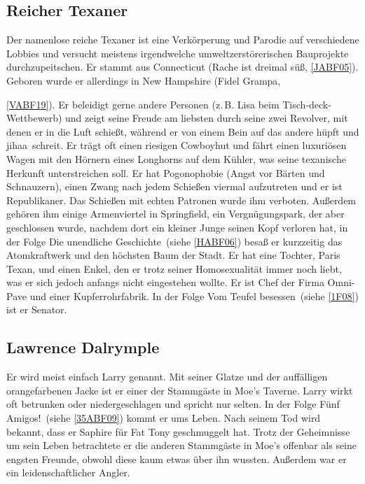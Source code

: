 {\subsection{Reicher Texaner}\label{ReicherTexaner}
Der namenlose reiche Texaner ist eine Verkörperung und Parodie auf verschiedene Lobbies und versucht meistens irgendwelche umweltzerstörerischen Bauprojekte durchzupeitschen. Er stammt aus Connecticut (\glqq Rache ist dreimal süß\grqq , \ref{JABF05}). Geboren wurde er allerdings in New Hampshire (\glqq Fidel Grampa\grqq, }\ref{VABF19}). Er beleidigt gerne andere Personen (z.\,B. Lisa beim Tisch-deck-Wettbewerb) und zeigt seine Freude am liebsten durch seine zwei Revolver, mit denen er in die Luft schießt, während er von einem Bein auf das andere hüpft und \glqq jihaa\grqq\ schreit. Er trägt oft einen riesigen Cowboyhut und fährt einen luxuriösen Wagen mit den Hörnern eines Longhorns auf dem Kühler, was seine texanische Herkunft unterstreichen soll. Er hat Pogonophobie (Angst vor Bärten und Schnauzern), einen Zwang nach jedem Schießen viermal aufzutreten und er ist Republikaner. Das Schießen mit echten Patronen wurde ihm verboten. Außerdem gehören ihm einige Armenviertel in Springfield, ein Vergnügungspark, der aber geschlossen wurde, nachdem dort ein kleiner Junge seinen Kopf verloren hat, in der Folge \glqq Die unendliche Geschichte\grqq\ (siehe \ref{HABF06}) besaß er kurzzeitig das Atomkraftwerk und den höchsten Baum der Stadt. Er hat eine Tochter, Paris Texan, und einen Enkel, den er trotz seiner Homosexualität immer noch liebt, was er sich jedoch anfangs nicht eingestehen wollte. Er ist Chef der Firma Omni-Pave und einer Kupferrohrfabrik. In der Folge \glqq Vom Teufel besessen\grqq\ (siehe \ref{1F08}) ist er Senator.

\subsection{Lawrence Dalrymple}\label{LawrenceDalrymple}
Er wird meist einfach Larry genannt. Mit seiner Glatze und der auffälligen orangefarbenen Jacke ist er einer der Stammgäste in Moe's Taverne. Larry wirkt oft betrunken oder niedergeschlagen und spricht nur selten. In der Folge \glqq Fünf Amigos!\grqq\ (siehe \ref{35ABF09}) kommt er ums Leben. Nach seinem Tod wird bekannt, dass er Saphire für Fat Tony geschmuggelt hat. Trotz der Geheimnisse um sein Leben betrachtete er die anderen Stammgäste in Moe's offenbar als seine engsten Freunde, obwohl diese kaum etwas über ihn wussten. Außerdem war er ein leidenschaftlicher Angler.


